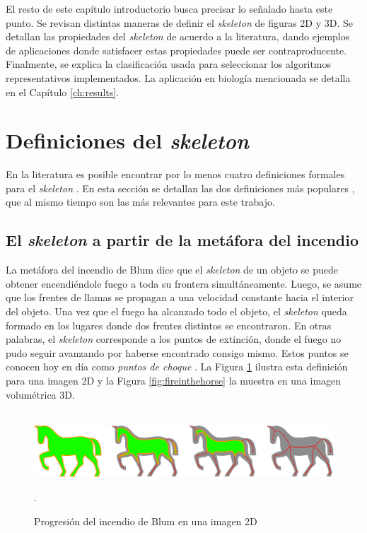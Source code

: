 El resto de este capítulo introductorio busca precisar lo señalado hasta este punto. Se revisan distintas maneras de definir el \textit{skeleton} de figuras 2D y 3D. Se detallan las propiedades del \textit{skeleton} de acuerdo a la literatura, dando ejemplos de aplicaciones donde satisfacer estas propiedades puede ser contraproducente. Finalmente, se explica la clasificación usada para seleccionar los algoritmos representativos implementados. La aplicación en biología mencionada se detalla en el Capítulo \ref{ch:results}.

\section{Definiciones del \textit{skeleton}}

En la literatura es posible encontrar por lo menos cuatro definiciones formales para el \textit{skeleton} \cite{tagliasacchi20163d}. En esta sección se detallan las dos definiciones más populares \cite{cornea2005computing}, que al mismo tiempo son las más relevantes para este trabajo.

\subsection{El \textit{skeleton} a partir de la metáfora del incendio}
\label{ssec:grassfire}

La metáfora del incendio de Blum \cite{Blum:1967} dice que el \textit{skeleton} de un objeto se puede obtener encendiéndole fuego a toda su frontera simultáneamente. Luego, se asume que los frentes de llamas se propagan a una velocidad constante hacia el interior del objeto. Una vez que el fuego ha alcanzado todo el objeto, el \textit{skeleton} queda formado en los lugares donde dos frentes distintos se encontraron. En otras palabras, el \textit{skeleton} corresponde a los puntos de extinción, donde el fuego no pudo seguir avanzando por haberse encontrado consigo mismo. Estos puntos se conocen hoy en día como \textit{puntos de choque} \cite{leymarie2003three}. La Figura \ref{fig:horseonfire} ilustra esta definición para una imagen 2D y la Figura \ref{fig:fireinthehorse} la muestra en una imagen volumétrica 3D.
\\\\
\begin{figure}[ht]\centering
\includegraphics[width=0.9\linewidth]{images/horseonfire}
\caption{Progresión del incendio de Blum en una imagen 2D}.
\label{fig:horseonfire}
\end{figure}

